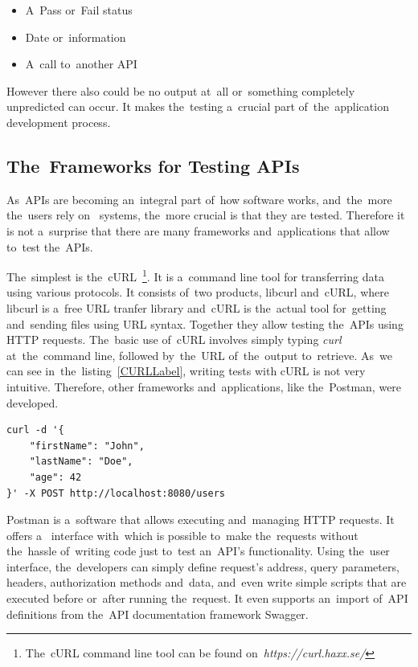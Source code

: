 \begin{itemize}
  \item A~Pass or~Fail status
  \item Date or~information
  \item A~call to~another API
\end{itemize}

However there also could be no output at~all or~something completely unpredicted
can occur. It makes the~testing a~crucial part of~the~application development
process.

\subsection{The~Frameworks for Testing APIs}
As~APIs are becoming an~integral part of~how software works, and~the~more
the~users rely on~ systems, the~more crucial is that they are
tested. Therefore it is not a~surprise that there are many frameworks
and~applications that allow to~test the~APIs.

The~simplest is the~cURL~\footnote{The~cURL command line tool can be found
on~\textit{https://curl.haxx.se/}}.
It is a~command line tool for transferring data using various protocols. It
consists of~two products, libcurl and~cURL, where libcurl is a~free  URL tranfer library and~cURL is
the~actual tool for~getting and~sending files using URL syntax. Together they
allow testing the~APIs using HTTP requests. The~basic use of~cURL involves
simply typing \textit{curl} at~the~command line, followed by~the~URL
of~the~output to~retrieve. As~we can see in~the~listing~\ref{CURLLabel}, writing tests with cURL is not
very intuitive. Therefore, other frameworks and~applications, like the~Postman,
were developed.

\vspace{2mm}
\begin{lstlisting}[caption=An~example of~POST request that creates new user
on~the~server using cURL.,label=CURLLabel,language=XML]
curl -d '{
	"firstName": "John",
	"lastName": "Doe",
	"age": 42
}' -X POST http://localhost:8080/users
\end{lstlisting}

Postman is a~software that allows executing and~managing HTTP requests. It
offers a~ interface with~which is possible to~make
the~requests without the~hassle of~writing code just to~test an~API's
functionality. Using the~user interface, the~developers can simply define
request's address, query parameters, headers, authorization methods and~data,
and~even write simple scripts that are executed before or~after running
the~request. It even supports an~import of~API definitions from the~API
documentation framework Swagger.

